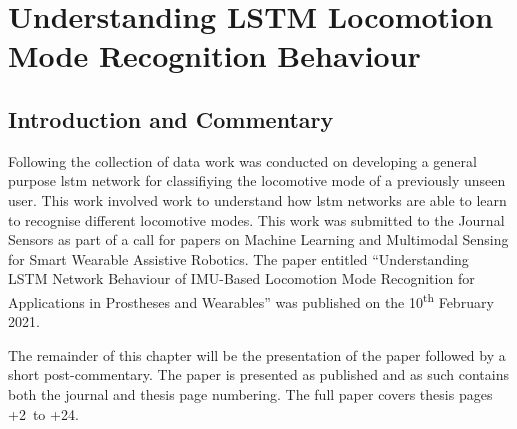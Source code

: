 \chapter{Understanding LSTM Locomotion Mode Recognition Behaviour}
\label{chp:lstm-general}

\section{Introduction and Commentary}
Following the collection of data work was conducted on developing a general purpose \acrshort{lstm} network for classifiying the locomotive mode of a previously unseen user. This work involved work to understand how \acrshort{lstm} networks are able to learn to recognise different locomotive modes. This work was submitted to the Journal Sensors as part of a call for papers on Machine Learning and Multimodal Sensing for Smart Wearable Assistive Robotics. The paper entitled ``Understanding LSTM Network Behaviour of IMU-Based Locomotion Mode Recognition for Applications in Prostheses and Wearables'' was published on the 10\textsuperscript{th} February 2021.

\newcommand\x{\value{page}}
The remainder of this chapter will be the presentation of the paper followed by a short post-commentary. The paper is presented as published and as such contains both the journal and thesis page numbering. The full paper covers thesis pages \the\numexpr\x+2\relax \ to \the\numexpr\x+24\relax.

